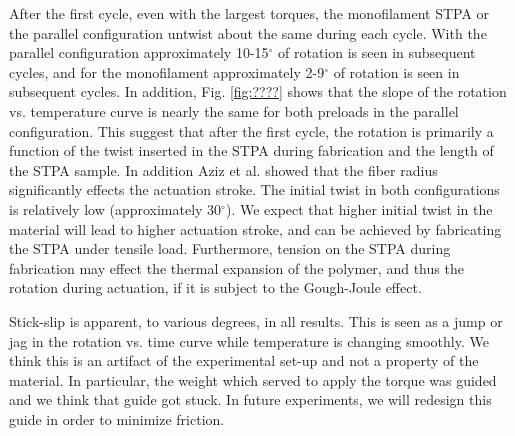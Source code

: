 \documentclass[twocolumn,10pt]{asme2e}
\begin{document}
After the first cycle, even with the largest torques, the monofilament STPA or the parallel configuration untwist about the same during each cycle.  
With the parallel configuration approximately 10-15$^\circ$ of rotation is seen in subsequent cycles,  and for the monofilament approximately 2-9$^\circ$ of rotation is seen in subsequent cycles.    In addition, Fig. \ref{fig:????} shows that the slope of the rotation vs. temperature curve is nearly the same for both preloads in the parallel configuration.  This suggest that after the first cycle, the rotation is primarily a function of the twist inserted in the STPA during fabrication and the length of the STPA sample.  In addition Aziz et al. \cite{Aziz_Controlled} showed that the fiber radius significantly effects the actuation stroke.  
The initial twist in both configurations is relatively low (approximately 30$^\circ$).  We expect that higher initial twist in the material will lead to higher actuation stroke, and can be achieved by fabricating the STPA under tensile load.   Furthermore, tension on the STPA during fabrication may effect the thermal expansion of the polymer, and thus the rotation during actuation, if it is subject to the Gough-Joule effect.  



Stick-slip is apparent, to various degrees, in all results. This is seen as a jump or jag in the rotation vs. time curve while temperature is changing smoothly.  We think this is an artifact of the experimental set-up and not a property of the material.  In particular, the weight which served to apply the torque was guided and we think that guide got stuck.  In future experiments, we will redesign this guide in order to minimize friction.  


\end{document}

